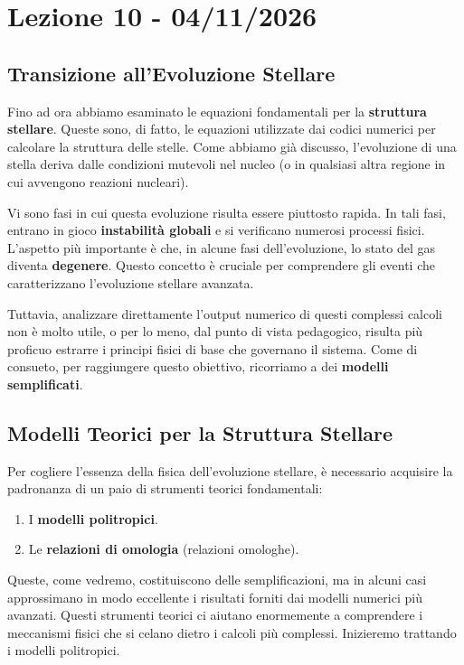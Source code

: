 \chapter{Lezione 10 - 04/11/2026}

\section{Transizione all'Evoluzione Stellare}

Fino ad ora abbiamo esaminato le equazioni fondamentali per la \textbf{struttura stellare}. Queste sono, di fatto, le equazioni utilizzate dai codici numerici per calcolare la struttura delle stelle. Come abbiamo già discusso, l'evoluzione di una stella deriva dalle condizioni mutevoli nel nucleo (o in qualsiasi altra regione in cui avvengono reazioni nucleari).

Vi sono fasi in cui questa evoluzione risulta essere piuttosto rapida. In tali fasi, entrano in gioco \textbf{instabilità globali} e si verificano numerosi processi fisici. L'aspetto più importante è che, in alcune fasi dell'evoluzione, lo stato del gas diventa \textbf{degenere}. Questo concetto è cruciale per comprendere gli eventi che caratterizzano l'evoluzione stellare avanzata.

Tuttavia, analizzare direttamente l'output numerico di questi complessi calcoli non è molto utile, o per lo meno, dal punto di vista pedagogico, risulta più proficuo estrarre i principi fisici di base che governano il sistema. Come di consueto, per raggiungere questo obiettivo, ricorriamo a dei \textbf{modelli semplificati}.

\section{Modelli Teorici per la Struttura Stellare}

Per cogliere l'essenza della fisica dell'evoluzione stellare, è necessario acquisire la padronanza di un paio di strumenti teorici fondamentali:
\begin{enumerate}
\item I \textbf{modelli politropici}.
\item Le \textbf{relazioni di omologia} (relazioni omologhe).
\end{enumerate}

Queste, come vedremo, costituiscono delle semplificazioni, ma in alcuni casi approssimano in modo eccellente i risultati forniti dai modelli numerici più avanzati. Questi strumenti teorici ci aiutano enormemente a comprendere i meccanismi fisici che si celano dietro i calcoli più complessi. Inizieremo trattando i modelli politropici.

